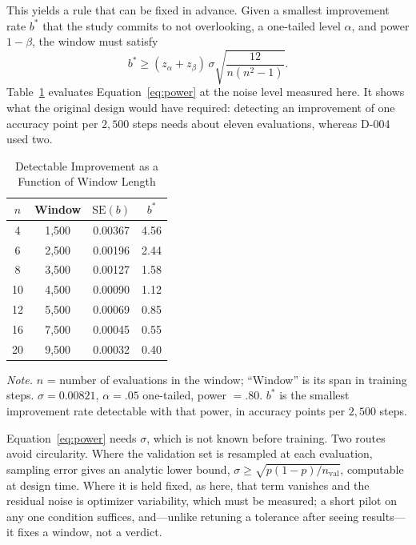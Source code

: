 \documentclass[jou,11pt,donotrepeattitle]{apa7}
\begin{document}
This yields a rule that can be fixed in advance. Given a smallest improvement rate $b^{*}$ that
the study commits to not overlooking, a one-tailed level $\alpha$, and power $1 - \beta$, the
window must satisfy
%
\begin{equation}
b^{*} \geq (z_{\alpha} + z_{\beta})\, \sigma \sqrt{\frac{12}{n(n^{2}-1)}} .
\label{eq:power}
\end{equation}
%
Table~\ref{tab:pot} evaluates Equation~\ref{eq:power} at the noise level measured here. It shows
what the original design would have required: detecting an improvement of one accuracy point per
$2{,}500$ steps needs about eleven evaluations, whereas D-004 used two.

\begin{table}[htbp]
\caption{Detectable Improvement as a Function of Window Length}
\label{tab:pot}
\small
\begin{tabular}{cccc}
\toprule
$n$ & Window & $\mathrm{SE}(b)$ & $b^{*}$ \\
\midrule
4  & 1,500 & 0.00367 & 4.56 \\
6  & 2,500 & 0.00196 & 2.44 \\
8  & 3,500 & 0.00127 & 1.58 \\
10 & 4,500 & 0.00090 & 1.12 \\
12 & 5,500 & 0.00069 & 0.85 \\
16 & 7,500 & 0.00045 & 0.55 \\
20 & 9,500 & 0.00032 & 0.40 \\
\bottomrule
\end{tabular}

\vspace{5pt}
{\small\raggedright \textit{Note.} $n$ = number of evaluations in the window; ``Window'' is its span in
training steps. $\sigma = 0.00821$, $\alpha = .05$ one-tailed, power $= .80$. $b^{*}$ is the
smallest improvement rate detectable with that power, in accuracy points per $2{,}500$ steps.
\par}
\end{table}

Equation~\ref{eq:power} needs $\sigma$, which is not known before training. Two routes avoid
circularity. Where the validation set is resampled at each evaluation, sampling error gives an
analytic lower bound, $\sigma \geq \sqrt{p(1-p)/n_{\text{val}}}$, computable at design time.
Where it is held fixed, as here, that term vanishes and the residual noise is optimizer
variability, which must be measured; a short pilot on any one condition suffices, and---unlike
retuning a tolerance after seeing results---it fixes a window, not a verdict.
\end{document}
